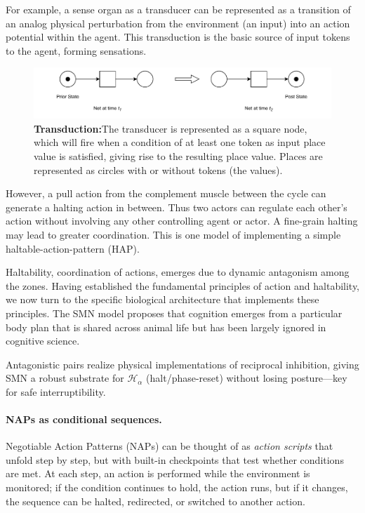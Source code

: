 For example, a sense organ as a transducer can be represented as a transition of an analog physical perturbation from the environment (an input) into an action potential within the agent. This transduction is the basic source of input tokens to the agent, forming sensations.
\begin{figure}[ht] 
\includegraphics[width=\textwidth]{graphics/PN_Transduction.pdf}
\caption{\textbf{Transduction:}The transducer is represented as a square node, which will fire when a condition of at least one token as input place value is satisfied, giving rise to the resulting place value.
Places are represented as circles with or without tokens (the values).}
\label{transduction}
\end{figure}

However, a pull action from the complement muscle between the cycle can generate a halting action in between.  Thus two actors can regulate each other's action without involving any other controlling agent or actor. A fine-grain halting may lead to greater coordination.  This is one model of implementing a simple haltable-action-pattern (HAP). 

Haltability, coordination of actions, emerges due to dynamic antagonism among the zones. Having established the fundamental principles of action and haltability, we now turn to the specific biological architecture that implements these principles. The SMN model proposes that cognition emerges from a particular body plan that is shared across animal life but has been largely ignored in cognitive science.

Antagonistic pairs realize physical implementations of reciprocal inhibition, giving SMN a robust substrate for $\mathcal{H}_\alpha$ (halt/phase-reset) without losing posture—key for safe interruptibility.

\paragraph{NAPs as conditional sequences.}
Negotiable Action Patterns (NAPs) can be thought of as \emph{action scripts} that unfold step by step, 
but with built-in checkpoints that test whether conditions are met. 
At each step, an action is performed while the environment is monitored; 
if the condition continues to hold, the action runs, but if it changes, the sequence can be halted, redirected, or switched to another action. 

